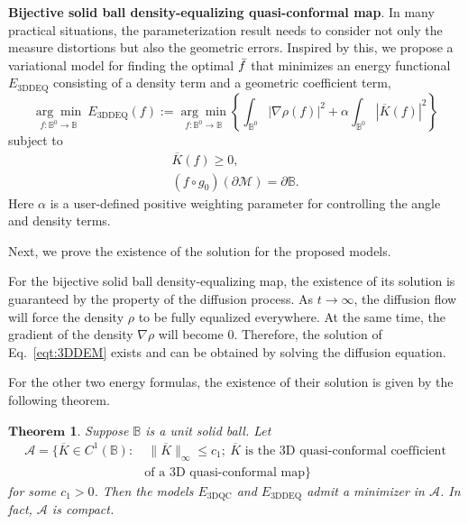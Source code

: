 \documentclass{article}
\newtheorem{theorem}[defn]{$\mathbf{Theorem}$}
\begin{document}
\textbf{Bijective solid ball density-equalizing quasi-conformal map}. In many practical situations, the parameterization result needs to consider not only the measure distortions but also the geometric errors. 
Inspired by this, we propose a variational model for finding the optimal $\Bar{f}$ that minimizes an energy functional $E_{\text{3DDEQ}}$ consisting of a density term and a geometric coefficient term, 
\begin{equation}\label{eqt:3DDEQ}
    \underset{f: \mathbb B^0 \rightarrow \mathbb B}{\arg \min } \ E_{\text{3DDEQ}}(f):=\underset{f: \mathbb B^0 \rightarrow \mathbb B}{\arg \min }\left\{\int_{\mathbb B^0} |\nabla \rho(f) |^2 + \alpha \int_{\mathbb B^0}| \overline{K}(f)|^2\right\}
\end{equation}
subject to
\begin{align}
    \overline{K}\left(f\right) \geq 0, \\
    \left(f \circ g_0 \right) \left( \partial \mathcal{M} \right) = \partial \mathbb B.
\end{align}
Here $\alpha$ is a user-defined positive weighting parameter for controlling the angle and density terms. 

Next, we prove the existence of the solution for the proposed models. 

For the bijective solid ball density-equalizing map, the existence of its solution is guaranteed by the property of the diffusion process. As $t \rightarrow \infty$, the diffusion flow will force the density $\rho$ to be fully equalized everywhere. At the same time, the gradient of the density $\nabla \rho$ will become $0$. Therefore, the solution of Eq.~\eqref{eqt:3DDEM} exists and can be obtained by solving the diffusion equation.

For the other two energy formulas, the existence of their solution is given by the following theorem.

\begin{theorem}\label{existence_sol}
    Suppose $\mathbb B$ is a unit solid ball. Let
    \begin{equation}
    \begin{aligned}
        \mathcal{A} = \{\overline{K} \in C^1(\mathbb B): & \ \|\overline{K}\|_{\infty} \leq c_1 ; \  \overline{K} \text{ is the 3D quasi-conformal coefficient} \\ & \text{of a 3D quasi-conformal map} \}
    \end{aligned}
    \end{equation}
    for some $c_1>0$. Then the models $E_{\text{3DQC}}$ and $E_{\text{3DDEQ}}$ admit a minimizer in $\mathcal{A}$. In fact, $\mathcal{A}$ is compact.
 \end{theorem}
\end{document}
